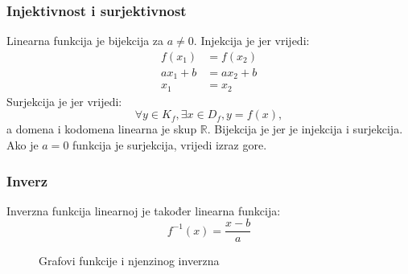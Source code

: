 \subsubsection{Injektivnost i surjektivnost \lin}
    Linearna funkcija je bijekcija za \(a \neq 0\). Injekcija je jer vrijedi:
    \begin{equation*}
        \begin{split}
            f(x_1)      &= f(x_2) \\
            ax_1 + b    &= ax_2 + b \\
            x_1         &= x_2
        \end{split}
    \end{equation*}
    Surjekcija je jer vrijedi:
    \[\forall y \in K_f, \exists x \in D_f, y = f(x),\]
    a domena i kodomena linearna je skup $\mathbb{R}$.
    Bijekcija je jer je injekcija i surjekcija.
    Ako je \(a = 0\) funkcija je surjekcija, vrijedi izraz gore.
    
\subsubsection{Inverz \lin}
    Inverzna funkcija linearnoj je također linearna funkcija:
    \[f^{-1}(x) = \frac{x - b}{a}\]
    \begin{figure}[ht]
        \centering
        \caption{Grafovi funkcije i njenzinog inverzna} 
        \label{fig:template}
    \end{figure}
    \\